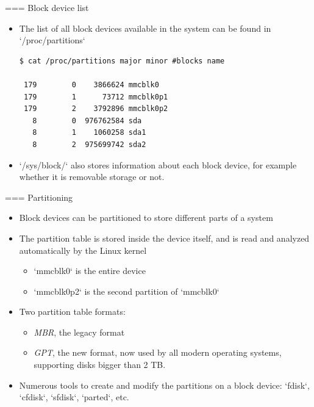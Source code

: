 === Block device list
  \begin{itemize}
  \item The list of all block devices available in the system can be
    found in `/proc/partitions`\\
\begin{verbatim}
$ cat /proc/partitions major minor #blocks name

 179        0    3866624 mmcblk0
 179        1      73712 mmcblk0p1
 179        2    3792896 mmcblk0p2
   8        0  976762584 sda
   8        1    1060258 sda1
   8        2  975699742 sda2
\end{verbatim}
  \item `/sys/block/` also stores information about each block device,
     for example whether it is removable storage or not.
  \end{itemize}


=== {Partitioning}
  \begin{itemize}
  \item Block devices can be partitioned to store different parts of a
    system
  \item The partition table is stored inside the device itself, and is
    read and analyzed automatically by the Linux kernel
    \begin{itemize}
    \item `mmcblk0` is the entire device
    \item `mmcblk0p2` is the second partition of `mmcblk0`
    \end{itemize}
  \item Two partition table formats:
    \begin{itemize}
    \item {\em MBR}, the legacy format
    \item {\em GPT}, the new format, now used by all modern operating
          systems, supporting disks bigger than 2 TB.
    \end{itemize}
  \item Numerous tools to create and modify the partitions on a block
    device: `fdisk`, `cfdisk`, `sfdisk`, `parted`,
    etc.
  \end{itemize}


